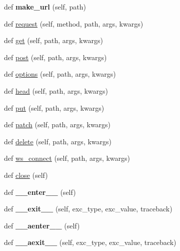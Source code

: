 \begin{DoxyCompactItemize}
def {\bfseries make\+\_\+url} (self, path)
\item 
def \hyperlink{classaiohttp_1_1test__utils_1_1_test_client_ad50152750e41be8b95477dc6b1676577}{request} (self, method, path, args, kwargs)
\item 
def \hyperlink{classaiohttp_1_1test__utils_1_1_test_client_ab56516488cabc6243d7fdb47a6b969d0}{get} (self, path, args, kwargs)
\item 
def \hyperlink{classaiohttp_1_1test__utils_1_1_test_client_a2738518470feda75b40603eb7e9799fe}{post} (self, path, args, kwargs)
\item 
def \hyperlink{classaiohttp_1_1test__utils_1_1_test_client_a6aeb76dc70b04d059c17b6c96736e22d}{options} (self, path, args, kwargs)
\item 
def \hyperlink{classaiohttp_1_1test__utils_1_1_test_client_a17a8a9a6aa8307cf49dff45cd5087cdd}{head} (self, path, args, kwargs)
\item 
def \hyperlink{classaiohttp_1_1test__utils_1_1_test_client_a4cbc6b61b7e81b0b9756b9001ac036a5}{put} (self, path, args, kwargs)
\item 
def \hyperlink{classaiohttp_1_1test__utils_1_1_test_client_ad5b2a7b5e94af8344c6366bcfbaf604a}{patch} (self, path, args, kwargs)
\item 
def \hyperlink{classaiohttp_1_1test__utils_1_1_test_client_a5253f095ff3f9c3c27a92c3f1ae153c8}{delete} (self, path, args, kwargs)
\item 
def \hyperlink{classaiohttp_1_1test__utils_1_1_test_client_a91c8fd84f01420bf8593a450440bf52e}{ws\+\_\+connect} (self, path, args, kwargs)
\item 
def \hyperlink{classaiohttp_1_1test__utils_1_1_test_client_a9c48b2869ddd4bf8d27aa268edcaa4e8}{close} (self)
\item 
\mbox{\label{classaiohttp_1_1test__utils_1_1_test_client_a81acb429f83142292f627bf6935d7ada}} 
def {\bfseries \+\_\+\+\_\+enter\+\_\+\+\_\+} (self)
\item 
\mbox{\label{classaiohttp_1_1test__utils_1_1_test_client_a66029a49df746b1f9e7ecc67220b5f55}} 
def {\bfseries \+\_\+\+\_\+exit\+\_\+\+\_\+} (self, exc\+\_\+type, exc\+\_\+value, traceback)
\item 
\mbox{\label{classaiohttp_1_1test__utils_1_1_test_client_abf7e72bbd8ce86644a5af41de4e76c14}} 
def {\bfseries \+\_\+\+\_\+aenter\+\_\+\+\_\+} (self)
\item 
\mbox{\label{classaiohttp_1_1test__utils_1_1_test_client_abb181596b501ddcd661938b3ed7624cb}} 
def {\bfseries \+\_\+\+\_\+aexit\+\_\+\+\_\+} (self, exc\+\_\+type, exc\+\_\+value, traceback)
\end{DoxyCompactItemize}


